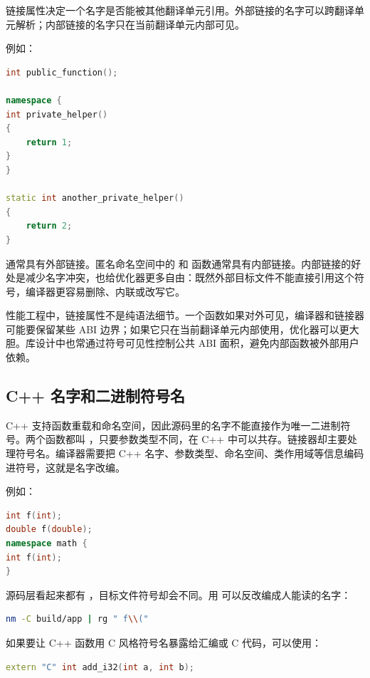 链接属性决定一个名字是否能被其他翻译单元引用。外部链接的名字可以跨翻译单元解析；内部链接的名字只在当前翻译单元内部可见。

例如：

\begin{lstlisting}[language=C++]
int public_function();

namespace {
int private_helper()
{
    return 1;
}
}

static int another_private_helper()
{
    return 2;
}
\end{lstlisting}

 通常具有外部链接。匿名命名空间中的  和  函数通常具有内部链接。内部链接的好处是减少名字冲突，也给优化器更多自由：既然外部目标文件不能直接引用这个符号，编译器更容易删除、内联或改写它。

性能工程中，链接属性不是纯语法细节。一个函数如果对外可见，编译器和链接器可能要保留某些 ABI 边界；如果它只在当前翻译单元内部使用，优化器可以更大胆。库设计中也常通过符号可见性控制公共 ABI 面积，避免内部函数被外部用户依赖。

\subsection{C++ 名字和二进制符号名}

C++ 支持函数重载和命名空间，因此源码里的名字不能直接作为唯一二进制符号。两个函数都叫 ，只要参数类型不同，在 C++ 中可以共存。链接器却主要处理符号名。编译器需要把 C++ 名字、参数类型、命名空间、类作用域等信息编码进符号，这就是名字改编。

例如：

\begin{lstlisting}[language=C++]
int f(int);
double f(double);
namespace math {
int f(int);
}
\end{lstlisting}

源码层看起来都有 ，目标文件符号却会不同。用  可以反改编成人能读的名字：

\begin{lstlisting}[language=bash]
nm -C build/app | rg " f\\("
\end{lstlisting}

如果要让 C++ 函数用 C 风格符号名暴露给汇编或 C 代码，可以使用：

\begin{lstlisting}[language=C++]
extern "C" int add_i32(int a, int b);
\end{lstlisting}

